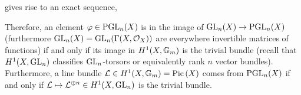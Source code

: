 \documentclass[12pt]{article}
\begin{document}
gives rise to an exact sequence,
\begin{center}
\end{center}
Therefore, an element $\varphi \in \mathrm{PGL}_n(X)$ is in the image of $\mathrm{GL}_n(X) \to \mathrm{PGL}_n(X)$ (furthermore $\mathrm{GL}_n(X) = \mathrm{GL}_n(\Gamma(X, \mathcal{O}_{X}))$ are everywhere invertible matrices of functions) if and only if its image in $H^1(X, \mathbb{G}_m)$ is the trivial bundle (recall that $H^1(X, \mathrm{GL}_n)$ classifies $\mathrm{GL}_n$-torsors or equivalently rank $n$ vector bundles). Furthermore, a line bundle $\mathcal{L} \in H^1(X, \mathbb{G}_m) = \mathrm{Pic} \left( X \right)$ comes from $\mathrm{PGL}_n(X)$ if and only if $\mathcal{L} \mapsto \mathcal{L}^{\oplus n} \in H^1(X, \mathrm{GL}_n)$ is the trivial bundle.
\bigskip\\
\end{document}

